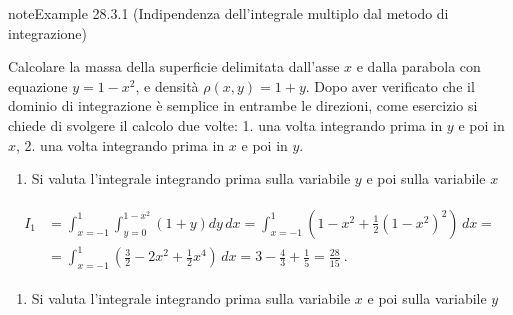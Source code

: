 \documentclass[letterpaper,10pt,italian]{jupyterBook}
\begin{document}
\begin{sphinxadmonition}{note}{Example 28.3.1 (Indipendenza dell’integrale multiplo dal metodo di integrazione)}



\sphinxAtStartPar
Calcolare la massa della superficie delimitata dall’asse \(x\) e dalla parabola con equazione \(y = 1 - x^2\), e densità \(\rho(x,y) = 1 + y\). Dopo aver verificato che il dominio di integrazione è semplice in entrambe le direzioni, come esercizio si chiede di svolgere il calcolo due volte: 1. una volta integrando prima in \(y\) e poi in \(x\), 2. una volta integrando prima in \(x\) e poi in \(y\).

\sphinxAtStartPar
{} 
\begin{enumerate}
%
\item {} 
\sphinxAtStartPar
Si valuta l’integrale integrando prima sulla variabile \(y\) e poi sulla variabile \(x\)

\end{enumerate}
\begin{equation*}
\begin{split}\begin{aligned}
I_1 
& = \int_{x=-1}^{1} \int_{y=0}^{1-x^2} \left( 1 + y \right) dy \, dx 
  = \int_{x=-1}^{1} \left( 1-x^2 + \frac{1}{2} (1-x^2)^2 \right) \, dx = \\ 
& = \int_{x=-1}^{1} \left( \frac{3}{2} - 2 x^2 + \frac{1}{2} x^4 \right) \, dx      
  = 3 - \frac{4}{3} + \frac{1}{5} = \frac{28}{15} \ . 
\end{aligned}\end{split}
\end{equation*}

\begin{enumerate}
%
\setcounter{enumi}{1}
\item {} 
\sphinxAtStartPar
Si valuta l’integrale integrando prima sulla variabile \(x\) e poi sulla variabile \(y\)


\end{enumerate}
\end{sphinxadmonition}
\end{document}
